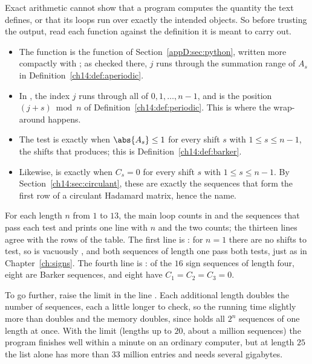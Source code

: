 Exact arithmetic cannot show that a program computes the quantity the text defines, or that its loops run over exactly the intended objects. So before trusting the output, read each function against the definition it is meant to carry out.
\begin{itemize}
\item The function  is the function  of Section~\ref{appD:sec:python}, written more compactly with ; as checked there, $j$ runs through the summation range of $A_s$ in Definition~\ref{ch14:def:aperiodic}.
\item In , the index $j$ runs through all of $0,1,\ldots,n-1$, and  is the position $(j+s)\bmod n$ of Definition~\ref{ch14:def:periodic}. This is where the wrap-around happens.
\item The test  is  exactly when $\abs{A_s}\le1$ for every shift $s$ with $1\le s\le n-1$, the shifts that  produces; this is Definition~\ref{ch14:def:barker}.
\item Likewise,  is  exactly when $C_s=0$ for every shift $s$ with $1\le s\le n-1$. By Section~\ref{ch14:sec:circulant}, these are exactly the sequences that form the first row of a circulant Hadamard matrix, hence the name.
\end{itemize}
For each length $n$ from $1$ to $13$, the main loop counts in  and  the sequences that pass each test and prints one line with $n$ and the two counts; the thirteen lines agree with the rows of the table. The first line is : for $n=1$ there are no shifts to test, so  is vacuously , and both sequences of length one pass both tests, just as in Chapter~\ref{ch:signs}. The fourth line is : of the $16$ sign sequences of length four, eight are Barker sequences, and eight have $C_1=C_2=C_3=0$.

To go further, raise the limit  in the line . Each additional length doubles the number of sequences, each a little longer to check, so the running time slightly more than doubles and the memory doubles, since  holds all $2^n$ sequences of one length at once. With the limit  (lengths up to $20$, about a million sequences) the program finishes well within a minute on an ordinary computer, but at length $25$ the list alone has more than $33$ million entries and needs several gigabytes.

